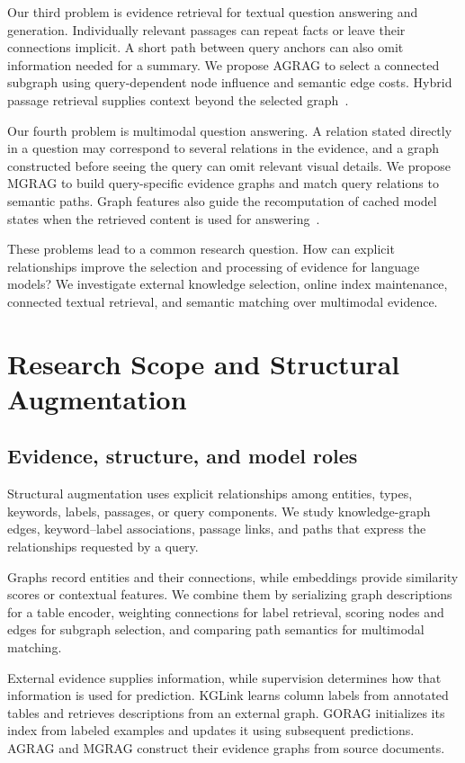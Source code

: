 Our third problem is evidence retrieval for textual question answering and generation. Individually relevant passages can repeat facts or leave their connections implicit. A short path between query anchors can also omit information needed for a summary. We propose AGRAG to select a connected subgraph using query-dependent node influence and semantic edge costs. Hybrid passage retrieval supplies context beyond the selected graph~\cite{agrag-paper}.

Our fourth problem is multimodal question answering. A relation stated directly in a question may correspond to several relations in the evidence, and a graph constructed before seeing the query can omit relevant visual details. We propose MGRAG to build query-specific evidence graphs and match query relations to semantic paths. Graph features also guide the recomputation of cached model states when the retrieved content is used for answering~\cite{mgrag-paper}.

These problems lead to a common research question. How can explicit relationships improve the selection and processing of evidence for language models? We investigate external knowledge selection, online index maintenance, connected textual retrieval, and semantic matching over multimodal evidence.

\section{Research Scope and Structural Augmentation}
\label{sec:introduction:scope}
\subsection{Evidence, structure, and model roles}
Structural augmentation uses explicit relationships among entities, types, keywords, labels, passages, or query components. We study knowledge-graph edges, keyword--label associations, passage links, and paths that express the relationships requested by a query.

Graphs record entities and their connections, while embeddings provide similarity scores or contextual features. We combine them by serializing graph descriptions for a table encoder, weighting connections for label retrieval, scoring nodes and edges for subgraph selection, and comparing path semantics for multimodal matching.

External evidence supplies information, while supervision determines how that information is used for prediction. KGLink learns column labels from annotated tables and retrieves descriptions from an external graph. GORAG initializes its index from labeled examples and updates it using subsequent predictions. AGRAG and MGRAG construct their evidence graphs from source documents.

